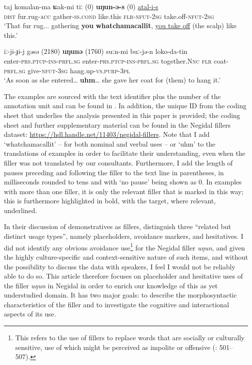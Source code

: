 \documentclass[output=paper]{langscibook}
\begin{document}
\ea \label{ex:pakendorf:2}
\gll taj
	komalan-ma
	ʨak-mi
	tiː
	\textup{(0)}
	\textbf{uŋun-ə-s}
	\textup{(0)}
	\uline{atal-i-s}\\
    \textsc{dist}
    fur.rug-\textsc{acc}
    gather-\textsc{ss.cond}
    like.this
    {}
    \textsc{flr-nfut-2sg}
    {}
    take.off-\textsc{nfut-2sg}\\
\glt ‘That fur rug... gathering \textbf{you} \textbf{whatchamacallit}, \uline{you take off} (the scalp) like this.’ 
\z


\ea \label{ex:pakendorf:3}
 iː-ji-ɟi-j gəsə \textup{(2180)} \textbf{uŋunə} \textup{(1760)} suːn-mi buː-jə-n loko-da-tin\\
		enter-\textsc{prs.ptcp-ins-prfl.sg} enter-\textsc{prs.ptcp-ins-prfl.sg} together.\textsc{Nnc} {} \textsc{flr} {} coat-\textsc{prfl.sg} give-\textsc{nfut-3sg} hang.up-\textsc{vs.purp-3pl}\\
\glt ‘As soon as she entered… \textbf{uhm}… she gave her coat for (them) to hang it.’ 
\z

The examples are sourced with the text identifier plus the number of the annotation unit and can be found in \citet{PakendorfAralova2017}. In addition, the unique ID from the coding sheet that underlies the analysis presented in this paper is provided; the coding sheet and further supplementary material can be found in the Negidal fillers dataset: \url{https://hdl.handle.net/11403/negidal-fillers}. Note that I add ‘whatchamacallit’ – for both nominal and verbal uses – or ‘uhm’ to the translations of examples in order to facilitate their understanding, even when the filler was not translated by our consultants. Furthermore, I add the length of pauses preceding and following the filler to the text line in parentheses, in milliseconds rounded to tens and with ‘no pause’ being shown as 0. In examples with more than one filler, it is only the relevant filler that is marked in this way; this is furthermore highlighted in bold, with the target, where relevant, underlined.

In their discussion of demonstratives as fillers, \citet[488]{HayashiYoon2006} distinguish three “related but distinct usage types”, namely placeholders, avoidance markers, and hesitatives. I did not identify any obvious avoidance use\footnote{This refers to the use of fillers to replace words that are socially or culturally sensitive, use of which might be perceived as impolite or offensive (\citealt{HayashiYoon2006}: 501--507).} for the Negidal filler \textit{uŋun}, and given the highly culture-specific and context-sensitive nature of such items, and without the possibility to discuss the data with speakers, I feel I would not be reliably able to do so. This article therefore focuses on placeholder and hesitative uses of the filler \textit{uŋun} in Negidal in order to enrich our knowledge of this as yet understudied domain. It has two major goals: to describe the morphosyntactic characteristics of the filler and to investigate the cognitive and interactional aspects of its use.
\end{document}
